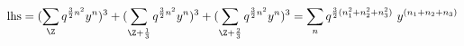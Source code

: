 \begin{equation}
  {\rm lhs} = (\sum_\Z q^{{3\over 2}n^2} y^n)^3 +
  (\sum_{\Z+{1\over 3}} q^{{3\over 2}n^2} y^n)^3 +
  (\sum_{\Z+{2\over 3}} q^{{3\over 2}n^2} y^n)^3  
= \sum_n q^{{3\over 2} (n_1^2 + n_2^2 + n_3^2)} ~y^{(n_1 + n_2 + n_3)}
\end{equation}

